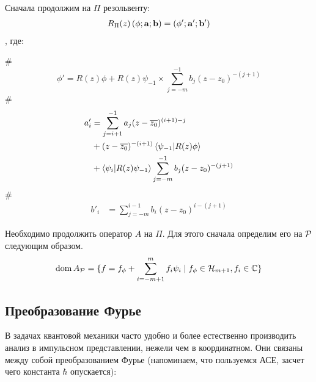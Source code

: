 Сначала продолжим на $\Pi$ резольвенту:
\begin{align*}
R_\Pi(z) \left( \phi; \vb{a}; \vb{b} \right) = \left( \phi'; \vb{a'}; \vb{b'} \right)
\end{align*}
, где:
\begin{ilist}
#
\[
\phi' = R(z) \phi + R(z) \psi_{-1} \times \sum\limits_{j = -m}^{-1} b_j (z - z_0)^{-(j + 1)}
\]
#
\begin{align*}
a'_i
&= \sum\limits_{j = i + 1}^{-1} a_j (z - \cconj{z_0})^{(i + 1) - j} \\
&+ (z - \cconj{z_0})^{-(i + 1)} \ip{\psi_{-1}}{R(z) \phi} \\
&+ \ip{\psi_i}{R(z) \psi_{-1}} \sum\limits_{j = -m}^{-1} b_j (z - z_0)^{-(j + 1)}
\end{align*}
#
\begin{align*}
b'_i
&= \sum\limits_{j = -m}^{i - 1} b_i (z - z_0)^{i - (j + 1)}
\end{align*}
\end{ilist}



Необходимо продолжить оператор $A$ на $\Pi$. Для этого сначала определим его на $\mathcal{P}$ следующим образом.
\[
\operatorname{dom} A_{\mathcal{P}} = \{f = f_\phi + \sum\limits_{i = -m + 1}^{m} f_i \psi_i \mid f_\phi \in \mathcal{H}_{m + 1}, f_{i}\in \mathbb{C} \}
\]






\subsection{Преобразование Фурье}
В задачах квантовой механики часто удобно и более естественно производить анализ в импульсном представлении, нежели чем в координатном. Они связаны между собой преобразованием Фурье (напоминаем, что пользуемся АСЕ, засчет чего константа $\hbar$ опускается):


